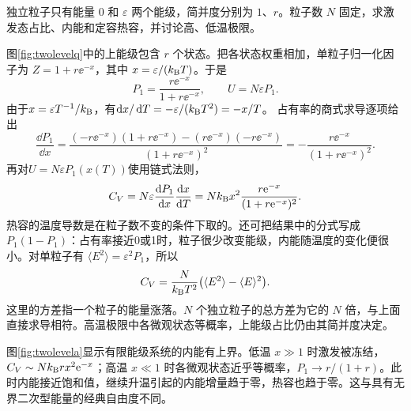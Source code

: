 
\begin{example}[两个能级的占有与热容]\label{ex:twolevels}
独立粒子只有能量 $0$ 和 $\varepsilon$ 两个能级，简并度分别为 $1$、$r$。粒子数 $N$ 固定，求激发态占比、内能和定容热容，并讨论高、低温极限。
\end{example}
\begin{solution}
图\ref{fig:twolevelq}中的上能级包含 $r$ 个状态。把各状态权重相加，单粒子归一化因子为 $Z=1+r\ee^{-x}$，其中 $x=\varepsilon/(k_{\mathrm B} T)$。于是
\[
 P_1=\frac{r\ee^{-x}}{1+r\ee^{-x}},\qquad U=N\varepsilon P_1.
\]
由于$x=\varepsilon T^{-1}/k_{\mathrm B}$，有$\mathop{}\!\mathrm d x/\mathop{}\!\mathrm d T=-\varepsilon/(k_{\mathrm B} T^2)=-x/T$。
占有率的商式求导逐项给出
\[
 \frac{\dd P_1}{\dd x}
 =\frac{(-r\ee^{-x})(1+r\ee^{-x})-(r\ee^{-x})(-r\ee^{-x})}
 {(1+r\ee^{-x})^2}
 =-\frac{r\ee^{-x}}{(1+r\ee^{-x})^2}.
\]
再对$U=N\varepsilon P_1(x(T))$使用链式法则，
\[
 C_V=N\varepsilon\frac{\mathop{}\!\mathrm d P_1}{\mathop{}\!\mathrm d x}\frac{\mathop{}\!\mathrm d x}{\mathop{}\!\mathrm d T}
 =Nk_{\mathrm B} x^2\frac{r\mathrm e^{-x}}{(1+r\mathrm e^{-x})^2}.
\]
热容的温度导数是在粒子数不变的条件下取的。还可把结果中的分式写成 $P_1(1-P_1)$：占有率接近0或1时，粒子很少改变能级，内能随温度的变化便很小。对单粒子有 $\langle E^2\rangle=\varepsilon^2P_1$，所以
\[
 C_V=\frac{N}{k_{\mathrm B} T^2}
 \bigl(\langle E^2\rangle-\langle E\rangle^2\bigr).
\]
这里的方差指一个粒子的能量涨落。$N$ 个独立粒子的总方差为它的 $N$ 倍，与上面直接求导相符。高温极限中各微观状态等概率，上能级占比仍由其简并度决定。

图\ref{fig:twolevela}显示有限能级系统的内能有上界。低温 $x\gg1$ 时激发被冻结，$C_V\sim Nk_{\mathrm B} r x^2\mathrm e^{-x}$；高温 $x\ll1$ 时各微观状态近乎等概率，$P_1\to r/(1+r)$。此时内能接近饱和值，继续升温引起的内能增量趋于零，热容也趋于零。这与具有无界二次型能量的经典自由度不同。
\end{solution}

